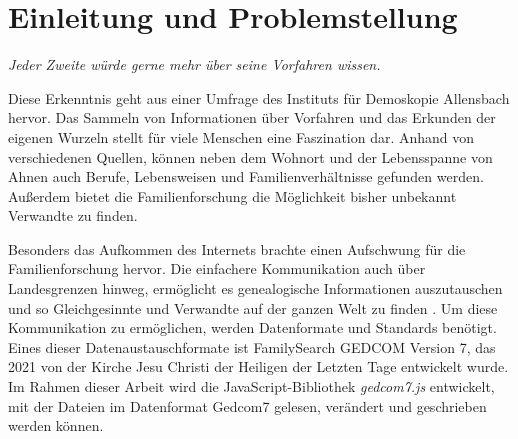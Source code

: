 \chapter{Einleitung und Problemstellung}
\label{chap: Einleitung und Problemstellung}
\begin{center}
	\textit{Jeder Zweite würde gerne mehr über seine Vorfahren wissen.} \cite{DemoskopieAllensbach2007}
\end{center}
Diese Erkenntnis geht aus einer Umfrage des Instituts für Demoskopie Allensbach hervor. Das Sammeln von Informationen über Vorfahren und das Erkunden der eigenen Wurzeln stellt für viele Menschen eine Faszination dar. Anhand von verschiedenen Quellen, können neben dem Wohnort und der Lebensspanne von Ahnen auch Berufe, Lebensweisen und Familienverhältnisse gefunden werden. Außerdem bietet die Familienforschung die Möglichkeit bisher unbekannt Verwandte zu finden. \cite{Malteser}

Besonders das Aufkommen des Internets brachte einen Aufschwung für die Familienforschung hervor. Die einfachere Kommunikation auch über Landesgrenzen hinweg, ermöglicht es genealogische Informationen auszutauschen und so Gleichgesinnte und Verwandte auf der ganzen Welt zu finden \cite{AhnenforschungDE}. Um diese Kommunikation zu ermöglichen, werden Datenformate und Standards benötigt. Eines dieser Datenaustauschformate ist  FamilySearch GEDCOM Version 7, das 2021 von der Kirche Jesu Christi der Heiligen der Letzten Tage entwickelt wurde. Im Rahmen dieser Arbeit wird die JavaScript-Bibliothek \textit{gedcom7.js} entwickelt, mit der Dateien im Datenformat Gedcom7 gelesen, verändert und geschrieben werden können. 

